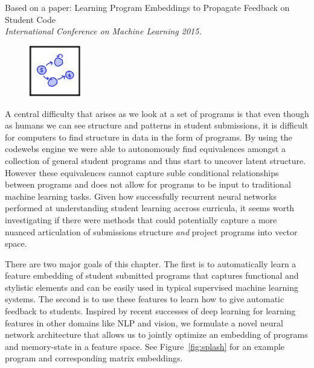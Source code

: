 Based on a paper: Learning Program Embeddings to Propagate Feedback on Student Code \cite{piechICML15} \\ \emph{International Conference on Machine Learning 2015.}

\vspace{7mm}

\begin{figure}[h!]
\includegraphics[width=0.2\textwidth]{img/assnType_3}
\end{figure}

\vspace{7mm}



A central difficulty that arises as we look at a set of programs is that even though as humans we can see structure and patterns in student submissions, it is difficult for computers to find structure in data in the form of programs.
By using the codewebs engine we were able to autonomously find equivalences amongst a collection of general student programs and thus start to uncover latent structure. However these equivalences cannot capture suble conditional relationships between programs and does not allow for programs to be input to traditional machine learning tasks. 
Given how successfully recurrent neural networks performed at understanding student learning accross curricula, it seems worth investigating if there were methods that could potentially capture a more nuanced articulation of submissions structure \emph{and} project programs into vector space.

There are two major goals of this chapter.  The 
first is to automatically learn a feature embedding of 
student submitted programs
that captures functional and stylistic elements and can be easily
used in typical supervised machine learning systems.
The second is to use these features to learn
how to give automatic feedback to students. Inspired by recent successes of deep learning for learning features 
in other domains like NLP and vision, 
we formulate a novel neural network architecture 
that allows us to jointly optimize an embedding of programs and memory-state in a feature space.
See Figure~\ref{fig:splash} for an example program and corresponding matrix embeddings.

